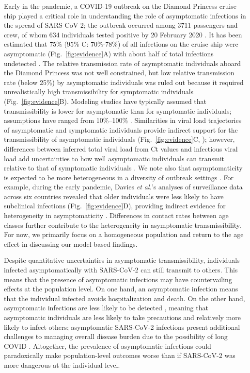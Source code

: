 \documentclass[12pt]{article}
\newcommand{\fref}[1]{Fig.~\ref{fig:#1}}
\begin{document}
Early in the pandemic, a COVID-19 outbreak on the Diamond Princess cruise ship played a critical role in understanding the role of asymptomatic infections in the spread of SARS-CoV-2;
the outbreak occurred among 3711 passengers and crew, of whom 634 individuals tested positive by 20 February 2020 \citep{mizumoto2020estimating}.
It has been estimated that 75\% (95\% C: 70\%-78\%) of all infections on the cruise ship were asymptomatic (\fref{evidence}A) with about half of total infections undetected \citep{emery2020}.
The relative transmission rate of asymptomatic individuals aboard the Diamond Princess was not well constrained, but low relative transmission rate (below 25\%) by asymptomatic individuals was ruled out because it required unrealistically high transmissibility for symptomatic individuals (\fref{evidence}B).
Modeling studies have typically assumed that transmissibility is lower for asymptomatic than for symptomatic individuals; assumptions have ranged from 10\%--100\% \citep{ferretti2020quantifying,lavezzo2020}.
Similarities in viral load trajectories of asymptomatic and symptomatic individuals provide indirect support for the transmissibility of asymptomatic individuals (\fref{evidence}C, \citep{Kissler2020}); 
however, differences between inferred total viral load from Ct values and infectious viral load add uncertainties to how well asymptomatic individuals can transmit relative to that of symptomatic individuals \citep{romero2021ct}.
We note also that asymptomaticity is expected to be more heterogeneous in a diversity of outbreak settings \citep{alene2021magnitude}.
For example, during the early pandemic, Davies \textit{et al.}'s analyses of surveillance data across six countries revealed that older individuals were less likely to have subclinical infections (\fref{evidence}D), providing indirect evidence for heterogeneity in asymptomaticity \cite{davies2020}.
Differences in contact rates between age classes further contribute to the heterogeneity in asymptomatic transmissibility.
For now, we primarily focus on a homogeneous population and return to the age effect in discussing our model-based findings.

Despite quantitative uncertainties in asymptomatic transmissibility, individuals infected asymptomatically with SARS-CoV-2 can still transmit to others. 
This means that the presence of asymptomatic infections may have countervailing effects at the population level. 
On one hand, an asymptomatic infection means that the individual infected avoids hospitalization and death. 
On the other hand, asymptomatic infections are less likely to be detected \citep{fraser2004factors,moghadas2020implications}, meaning that asymptomatic individuals are less likely to take precautions and relatively more likely to infect others;
asymptomatic SARS-CoV-2 infections present additional challenges to managing overall disease burden due to the possibility of long COVID \citep{xie2022long}.
Altogether, the prevalence of asymptomatic infections could paradoxically make population-level outcomes worse than if SARS-CoV-2 was more dangerous at the individual level.
\end{document}

